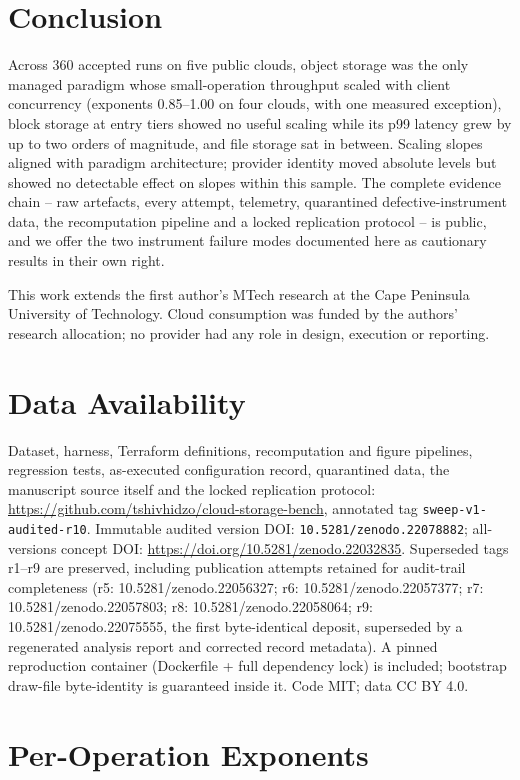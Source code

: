 \documentclass[manuscript,screen,review]{acmart}
\begin{document}
\section{Conclusion}
Across 360 accepted runs on five public clouds, object storage was the only
managed paradigm whose small-operation throughput scaled with client
concurrency (exponents 0.85--1.00 on four clouds, with one measured
exception), block storage at entry tiers showed no useful scaling while its
p99 latency grew by up to two orders of magnitude, and file storage sat in
between. Scaling slopes aligned with paradigm architecture; provider identity
moved absolute levels but showed no detectable effect on slopes within this
sample. The complete evidence chain -- raw artefacts, every attempt,
telemetry, quarantined defective-instrument data, the recomputation pipeline
and a locked replication protocol -- is public, and we offer the two
instrument failure modes documented here as cautionary results in their own
right.

\begin{acks}
This work extends the first author's MTech research at the Cape Peninsula
University of Technology. Cloud consumption was funded by the authors'
research allocation; no provider had any role in design, execution or
reporting.
\end{acks}

\section*{Data Availability}
Dataset, harness, Terraform definitions, recomputation and figure pipelines,
regression tests, as-executed configuration record, quarantined data, the
manuscript source itself and the locked replication protocol:
\url{https://github.com/tshivhidzo/cloud-storage-bench}, annotated tag
\texttt{sweep-v1-audited-r10}. Immutable audited version DOI:
\texttt{10.5281/zenodo.22078882}; all-versions concept DOI:
\url{https://doi.org/10.5281/zenodo.22032835}. Superseded tags r1--r9 are
preserved, including publication attempts retained for audit-trail
completeness (r5: 10.5281/zenodo.22056327; r6: 10.5281/zenodo.22057377;
r7: 10.5281/zenodo.22057803; r8: 10.5281/zenodo.22058064; r9:
10.5281/zenodo.22075555, the first byte-identical deposit, superseded by
a regenerated analysis report and corrected record metadata). A pinned
reproduction container (Dockerfile + full dependency lock) is included;
bootstrap draw-file byte-identity is guaranteed inside it. Code MIT; data
CC BY 4.0.

\appendix
\section{Per-Operation Exponents}
\begin{table}[h]
\caption{Write-phase and read-phase scaling exponents per cell, generated
directly from the archived analysis output.}
\small

\end{table}



\end{document}

